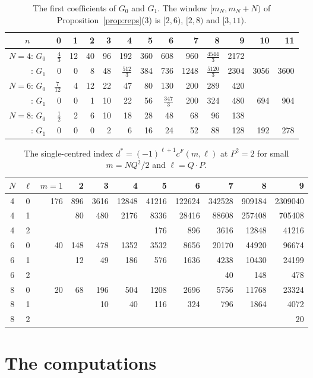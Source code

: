 \documentclass[11pt]{amsart}
\theoremstyle{definition}
\newcommand{\cF}{c^{F}}
\begin{document}
\begin{table}[H]
\centering
\caption{The first coefficients of $G_0$ and $G_1$. The window $[m_N,m_N+N)$ of Proposition~\ref{prop:reps}(3) is $[2,6)$, $[2,8)$ and $[3,11)$.}\label{tab:G}
\small
\begin{tabular}{c|rrrrrrrrrrrr}
\toprule
$n$ & 0&1&2&3&4&5&6&7&8&9&10&11\\
\midrule
$N=4$: $G_0$ & $\frac43$&12&40&96&192&360&608&960&$\frac{4544}3$&2172&&\\
$\phantom{N=4}$: $G_1$ & 0&0&8&48&$\frac{512}3$&384&736&1248&$\frac{5120}3$&2304&3056&3600\\
$N=6$: $G_0$ & $\frac7{12}$&4&12&22&47&80&130&200&289&420&&\\
$\phantom{N=6}$: $G_1$ & 0&0&1&10&22&56&$\frac{347}3$&200&324&480&694&904\\
$N=8$: $G_0$ & $\frac12$&2&6&10&18&28&48&68&96&138&&\\
$\phantom{N=8}$: $G_1$ & 0&0&0&2&6&16&24&52&88&128&192&278\\
\bottomrule
\end{tabular}
\end{table}

\begin{table}[H]
\centering
\caption{The single-centred index $d^*=(-1)^{\ell+1}\cF(m,\ell)$ at $P^2=2$ for small $m=NQ^2/2$ and $\ell=Q\cdot P$.}\label{tab:first}
\small
\begin{tabular}{cc|rrrrrrrrr}
\toprule
$N$ & $\ell$ & $m=1$&2&3&4&5&6&7&8&9\\
\midrule
4&0&176&896&3616&12848&41216&122624&342528&909184&2309040\\
4&1&&80&480&2176&8336&28416&88608&257408&705408\\
4&2&&&&&176&896&3616&12848&41216\\
\midrule
6&0&40&148&478&1352&3532&8656&20170&44920&96674\\
6&1&&12&49&186&576&1636&4238&10430&24199\\
6&2&&&&&&&40&148&478\\
\midrule
8&0&20&68&196&504&1208&2696&5756&11768&23324\\
8&1&&&10&40&116&324&796&1864&4072\\
8&2&&&&&&&&&20\\
\bottomrule
\end{tabular}
\end{table}

\section{The computations}\label{app:comp}
\end{document}
